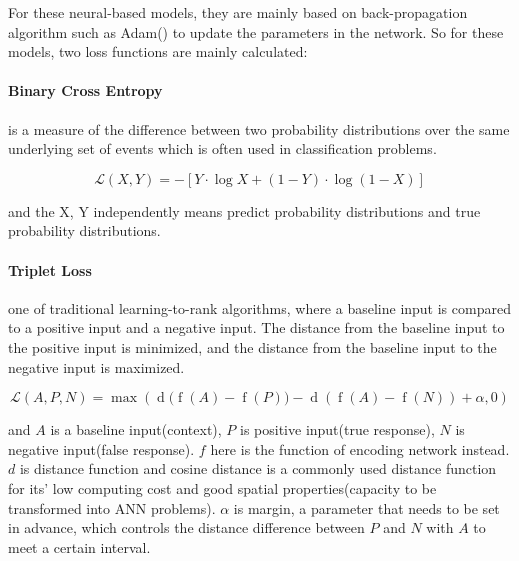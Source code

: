 \documentclass{article}
\begin{document}
For these neural-based models, they are mainly based on back-propagation algorithm such as Adam(\cite{kingma2014adam}) to update the parameters in the network. So for these models, two loss functions are mainly calculated:
\paragraph{Binary Cross Entropy} is a measure of the difference between two probability distributions over the same underlying set of events which is often used in classification problems.

\begin{equation}
{\mathcal {L}}(X, Y)=-\left[Y \cdot \log X+\left(1-Y \right) \cdot \log \left(1-X\right)\right]
\end{equation}

and the X, Y independently means predict probability distributions and true probability distributions.

\paragraph{Triplet Loss} one of traditional learning-to-rank algorithms, where a baseline input is compared to a positive input and a negative input. The distance from the baseline input to the positive input is minimized, and the distance from the baseline input to the negative input is maximized.

\begin{equation}
{\displaystyle {\mathcal {L}}\left(A,P,N\right)=\operatorname {max} \left({\operatorname{d} (\operatorname {f} \left(A\right)-\operatorname {f} \left(P\right)})-\operatorname{d}({\operatorname {f} \left(A\right)-\operatorname {f} \left(N\right)})+\alpha ,0\right)}
\end{equation}

and $A$ is a baseline input(context), $P$ is positive input(true response), $N$ is negative input(false response). $f$ here is the function of encoding network instead. $d$ is distance function and cosine distance is a commonly used distance function for its' low computing cost and good spatial properties(capacity to be transformed into ANN problems). $\alpha$ is margin, a parameter that needs to be set in advance, which controls the distance difference between $P$ and $N$ with $A$ to meet a certain interval.
\end{document}
